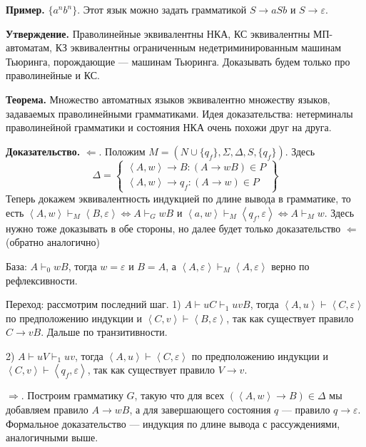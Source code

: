 \textbf{Пример.} $\{a^nb^n\}$. Этот язык можно задать грамматикой $S \to aSb$ и $S \to \varepsilon$.

\textbf{Утверждение.} Праволинейные эквивалентны НКА, КС эквивалентны МП-автоматам, КЗ эквивалентны ограниченным недетриминированным машинам Тьюринга, порождающие --- машинам Тьюринга.
Доказывать будем только про праволинейные и КС.

\textbf{Теорема.} Множество автоматных языков эквивалентно множеству языков, задаваемых праволинейными грамматиками.
Идея доказательства: нетерминалы праволинейной грамматики и состояния НКА очень похожи друг на друга.

\textbf{Доказательство.} $\Leftarrow$. Положим $M = (N \cup \{q_f\}, \Sigma, \Delta, S, \{q_f\})$.
Здесь 
\[
    \Delta =
    \left\{
    \begin{array}{l}
        \left< A, w \right> \to B: (A \to wB) \in P \\ 
        \left<A, w \right> \to q_f: (A \to w) \in P 
    \end{array}
    \right\}
\]
Теперь докажем эквивалентность индукцией по длине вывода в грамматике, то есть $\left<A, w \right> \vdash_M \left<B, \varepsilon \right> \iff A \vdash_G wB$ и $\left<a, w \right> \vdash_M \left<q_f, \varepsilon \right> \iff A \vdash_M w$.
Здесь нужно тоже доказывать в обе стороны, но далее будет только доказательство $\Leftarrow$ (обратно аналогично)

База: $A \vdash_0 wB$, тогда $w = \varepsilon$ и $B = A$, а $\left<A, \varepsilon \right> \vdash_M \left< A, \varepsilon \right>$ верно по рефлексивности.

Переход: рассмотрим последний шаг. 1) $A \vdash uC \vdash_1 uvB$, тогда $\left< A, u \right> \vdash \left<C, \varepsilon \right>$ по предположению индукции и $\left<C, v \right> \vdash \left<B, \varepsilon \right>$, так как существует правило $C \to vB$.
Дальше по транзитивности.

2) $A \vdash uV \vdash_1 uv$, тогда $\left<A, u \right> \vdash \left<C, \varepsilon \right>$ по предположению индукции и $\left<C, v \right> \vdash \left< q_f, \varepsilon \right>$, так как существует правило $V \to v$.

$\Rightarrow$. Построим грамматику $G$, такую что для всех $(\left<A, w \right> \to B) \in \Delta$ мы добавляем правило $A \to wB$, а для завершающего состояния $q$ --- правило $q \to \varepsilon$.
Формальное доказательство --- индукция по длине вывода с рассуждениями, аналогичными выше.

\QED

